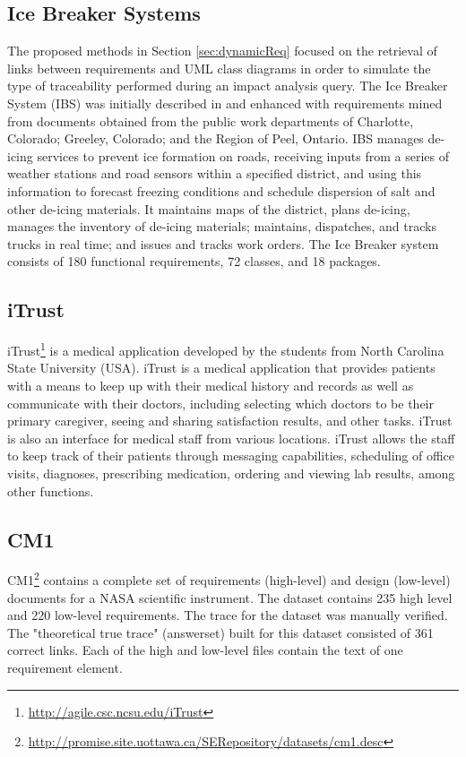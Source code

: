 \documentclass{report}
\begin{document}
\subsection{Ice Breaker Systems}
\label{sec:ds:IBS}
The proposed methods in Section \ref{sec:dynamicReq} focused on the retrieval of links between
requirements and UML class diagrams in order to simulate the type of traceability performed during
an impact analysis query. The Ice Breaker System (IBS) was initially described in 
\cite{robertson99} and enhanced with requirements mined from documents obtained from the public
work departments of Charlotte, Colorado; Greeley, Colorado; and the Region of Peel, Ontario. IBS
manages de-icing services to prevent ice formation on roads, receiving inputs from a series
of weather stations and road sensors within a specified district, and using this information
to forecast freezing conditions and schedule dispersion of salt and other de-icing materials.
It maintains maps of the district, plans de-icing, manages the inventory of de-icing
materials; maintains, dispatches, and tracks trucks in real time; and issues and tracks work 
orders. The Ice Breaker system consists of 180 functional requirements, 72 classes, and 18 packages.

\subsection{iTrust}
\label{sec:ds:iTrust}
iTrust\footnote{\url{http://agile.csc.ncsu.edu/iTrust}} is a medical application developed by the students
from North Carolina State University (USA). iTrust is a medical application that provides patients with a
means to keep up with their medical history and records as well as communicate with their doctors, 
including selecting which doctors to be their primary caregiver, seeing and sharing satisfaction results,
and other tasks. iTrust is also an interface for medical staff from various locations. iTrust allows the
staff to keep track of their patients through messaging capabilities, scheduling of office visits, 
diagnoses, prescribing medication, ordering and viewing lab results, among other functions.

\subsection{CM1}
\label{sec:ds:cm1}
CM1\footnote{\url{http://promise.site.uottawa.ca/SERepository/datasets/cm1.desc}} contains a complete set
of requirements (high-level) and design (low-level) documents for a NASA scientific instrument. The
dataset contains 235 high level and 220 low-level requirements. The trace for the dataset was manually
verified. The "theoretical true trace" (answerset) built for this dataset consisted of 361 correct links.
Each of the high and low-level files contain the text of one requirement element.
\end{document}
